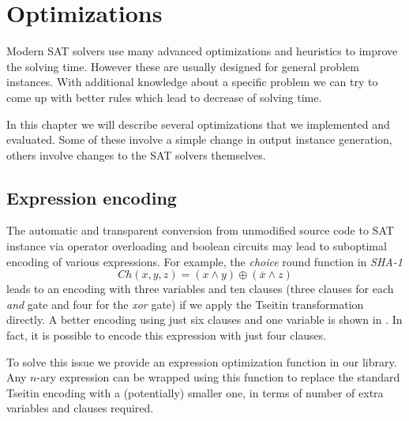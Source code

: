 \chapter{Optimizations}

Modern SAT solvers use many advanced optimizations and heuristics to improve the solving time.
However these are usually designed for general problem instances.
With additional knowledge about a specific problem we can try to come up with better rules which lead to decrease of solving time.

In this chapter we will describe several optimizations that we implemented and evaluated.
Some of these involve a simple change in output instance generation, others involve changes to the SAT solvers themselves.

\section{Expression encoding}
The automatic and transparent conversion from unmodified source code to SAT instance via operator overloading and boolean circuits may lead to suboptimal encoding of various expressions.
For example, the \emph{choice} round function in \emph{SHA-1}
\[
Ch(x, y, z) = (x \land y) \oplus (\overline{x} \land z)
\]
leads to an encoding with three variables and ten clauses (three clauses for each \emph{and} gate and four for the \emph{xor} gate) if we apply the Tseitin transformation directly.
A better encoding using just six clauses and one variable is shown in \cite{nossum2012sat}.
In fact, it is possible to encode this expression with just four clauses.

To solve this issue we provide an expression optimization function in our library.
Any $n$-ary expression can be wrapped using this function to replace the standard Tseitin encoding with a (potentially) smaller one, in terms of number of extra variables and clauses required.

%

